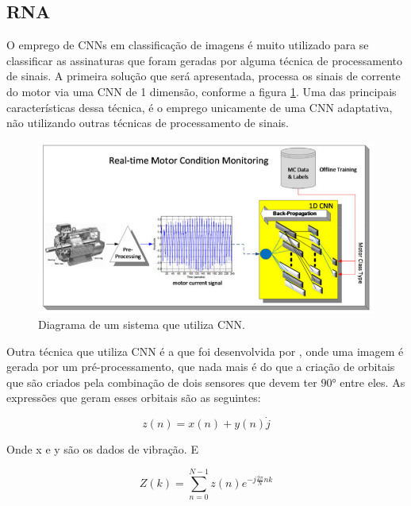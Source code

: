 \subsection{RNA}

O emprego de CNNs em classificação de imagens é muito utilizado para se classificar as assinaturas que foram geradas por alguma técnica
de processamento de sinais. A primeira solução que será apresentada, processa os sinais de corrente do motor via uma CNN de 1 dimensão,
conforme a figura \ref{fig:cnn_ince_p2}. Uma das principais características dessa técnica, é o emprego unicamente de uma CNN adaptativa,
não utilizando outras técnicas de processamento de sinais.


\begin{figure}[H]
    \caption{Diagrama de um sistema que utiliza CNN.}
    \begin{center}
        \includegraphics[scale=.45]{referencial/img/cnn_ince_p2.png}
    \end{center}
    \label{fig:cnn_ince_p2}
\end{figure}

Outra técnica que utiliza CNN é a que foi desenvolvida por \cite{Jeong2016}, onde uma imagem é gerada por um pré-processamento, que nada
mais é do que a criação de orbitais que são criados pela combinação de dois sensores que devem ter $\ang{90}$ entre eles. As expressões
que geram esses orbitais são as seguintes:

\begin{equation}\label{eq:}
    z(n) = x(n)+y(n)\dot j
\end{equation}

Onde x e y são os dados de vibração. E

\begin{equation}\label{eq:}
    Z(k) = \sum_{n=0}^{N-1}{z(n)e^{-j\frac{2\pi}{N}nk}}
\end{equation}

